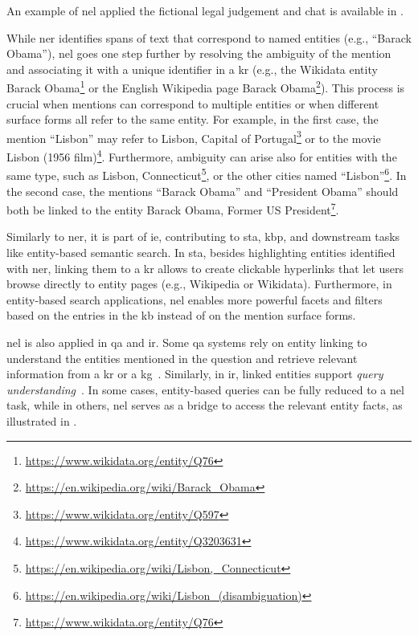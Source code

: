An example of \ac{nel} applied the fictional legal judgement and chat is available in . 



While \ac{ner} identifies spans of text that correspond to named entities (e.g., ``Barack Obama''), \ac{nel} goes one step further by resolving the ambiguity of the mention and associating it with a unique identifier in a \ac{kr} (e.g., the Wikidata entity Barack Obama\footnote{\url{https://www.wikidata.org/entity/Q76}} or the English Wikipedia page Barack Obama\footnote{\url{https://en.wikipedia.org/wiki/Barack_Obama}}). This process is crucial when mentions can correspond to multiple entities or when different surface forms all refer to the same entity. For example, in the first case, the mention ``Lisbon'' may refer to Lisbon, Capital of Portugal\footnote{\url{https://www.wikidata.org/entity/Q597}} or to the movie Lisbon (1956 film)\footnote{\url{https://www.wikidata.org/entity/Q3203631}}. Furthermore, ambiguity can arise also for entities with the same type, such as Lisbon, Connecticut\footnote{\url{https://en.wikipedia.org/wiki/Lisbon,_Connecticut}}, or the other cities named ``Lisbon''\footnote{\url{https://en.wikipedia.org/wiki/Lisbon_(disambiguation)}}.
In the second case, the mentions ``Barack Obama'' and ``President Obama'' should both be linked to the entity Barack Obama, Former US President\footnote{\url{https://www.wikidata.org/entity/Q76}}.

Similarly to \ac{ner}, it is part of \ac{ie}, contributing to \acl{sta}, \acl{kbp}, and downstream tasks like entity-based semantic search. In \ac{sta}, besides highlighting entities identified with \ac{ner}, linking them to a \ac{kr} allows to create clickable hyperlinks that let users browse directly to entity pages (e.g., Wikipedia or Wikidata).
Furthermore, in entity-based search applications, \ac{nel} enables more powerful facets and filters based on the entries in the \ac{kb} instead of on the mention surface forms.

\ac{nel} is also applied in \acl{qa} and \acl{ir}. Some \ac{qa} systems rely on entity linking to understand the entities mentioned in the question and retrieve relevant information from a \ac{kr} or a \ac{kg}~\cite{li-etal-2020-efficient,el_differences_for_qa_2022,eal_el_re_for_qa_2018}. Similarly, in \ac{ir}, linked entities support \emph{query understanding}~\cite{el_in_queries_2015}. In some cases, entity-based queries can be fully reduced to a \ac{nel} task, while in others, \ac{nel} serves as a bridge to access the relevant entity facts, as illustrated in .

